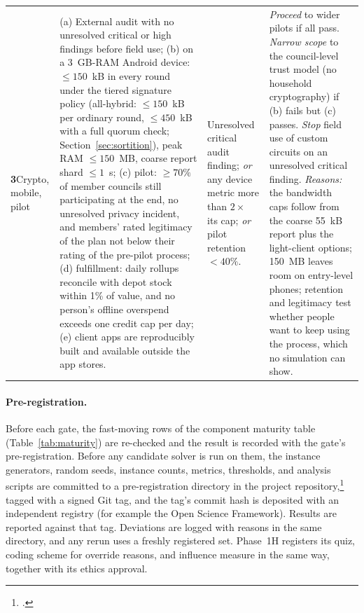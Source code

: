 \documentclass[10pt,twoside,openany]{book}
\theoremstyle{dpepstyle}
\begin{document}
{\begin{longtable}{L{0.45in} L{1.50in} L{1.10in} L{1.50in}}
\addlinespace[3pt]
\textbf{3}\newline Crypto, mobile, pilot & (a) External audit with no unresolved critical or high findings before field use; (b) on a 3~GB-RAM Android device: $\le 150$~kB in every round under the tiered signature policy (all-hybrid: $\le 150$~kB per ordinary round, $\le 450$~kB with a full quorum check; Section~\ref{sec:sortition}), peak RAM $\le 150$~MB, coarse report shard $\le 1$~s; (c) pilot: $\ge 70\%$ of member councils still participating at the end, no unresolved privacy incident, and members' rated legitimacy of the plan not below their rating of the pre-pilot process; (d) fulfillment: daily rollups reconcile with depot stock within 1\% of value, and no person's offline overspend exceeds one credit cap per day; (e) client apps are reproducibly built and available outside the app stores. & Unresolved critical audit finding; \emph{or} any device metric more than $2\times$ its cap; \emph{or} pilot retention $< 40\%$. & \emph{Proceed} to wider pilots if all pass. \emph{Narrow scope} to the council-level trust model (no household cryptography) if (b) fails but (c) passes. \emph{Stop} field use of custom circuits on an unresolved critical finding. \emph{Reasons:} the bandwidth caps follow from the coarse 55~kB report plus the light-client options; 150~MB leaves room on entry-level phones; retention and legitimacy test whether people want to keep using the process, which no simulation can show. \\
\end{longtable}}

\paragraph{Pre-registration.}
Before each gate, the fast-moving rows of the component maturity table (Table~\ref{tab:maturity}) are re-checked and the result is recorded with the gate's pre-registration.
Before any candidate solver is run on them, the instance generators, random seeds, instance counts, metrics, thresholds, and analysis scripts are committed to a pre-registration directory in the project repository,\footnote{.} tagged with a signed Git tag, and the tag's commit hash is deposited with an independent registry (for example the Open Science Framework). Results are reported against that tag. Deviations are logged with reasons in the same directory, and any rerun uses a freshly registered set. Phase~1H registers its quiz, coding scheme for override reasons, and influence measure in the same way, together with its ethics approval.
\end{document}
